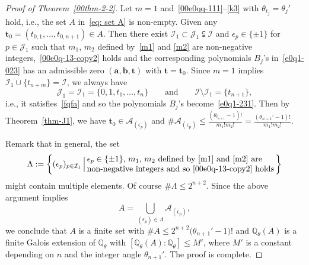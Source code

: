 \documentclass[10pt,a4paper]{amsart}
\numberwithin{equation}{section}
\def\Q{\mathbb Q}
\begin{document}
\begin{proof}[Proof of Theorem~\ref{00thm-2-2}]
Let $m=1$ and~\eqref{00e0qq-111}--\eqref{k3} with
$\theta_{t_j}=\theta_j'$ hold, i.e., the set $A$ in~\eqref{eq: set A}
is non-empty.
Given any $\boldsymbol t_0=(t_{0,1},\dots,t_{0,n+1})\in A$. Then
there exist
$\mathcal{I}_1\subset\mathcal{J}_1\subsetneqq \mathcal{I}$ and $\epsilon_p\in \{\pm 1\}$ for $p\in\mathcal{J}_1$ such that $m_1$, $m_2$ defined by~\eqref{m1} and \eqref{m2} are non-negative integers,~\eqref{00e0q-13-copy2} holds and the corresponding polynomials $B_j$'s in~\eqref{e0q1-023} has an admissible zero $(\boldsymbol a,\boldsymbol b,\boldsymbol t)$ with $\boldsymbol t=\boldsymbol t_0$.
Since $m=1$ implies $\mathcal{I}_1\cup\{t_{n+m}\}=\mathcal{I}$, we always have
\[\mathcal{J}_1=\mathcal{I}_1=\{0,1,t_1,\dots,t_n\}\qquad \text{and}\qquad\mathcal{I}\setminus \mathcal{I}_1=\{t_{n+1}\},\]
i.e., it satisfies~\eqref{fqfa} and so the polynomials $B_j$'s become~\eqref{e0q1-231}. Then by Theorem~\ref{thm-J1}, we have $\boldsymbol t_0\in\mathcal{A}_{(\epsilon_p)}$ and $\#\mathcal{A}_{(\epsilon_p)}\leq \frac{(\theta_{t_{n+1}}-1)!}{m_1!m_2!}=\frac{(\theta_{n+1}'-1)!}{m_1!m_2!}.$

Remark that in general, the set
\[
 \Lambda:=\left\{(\epsilon_p)_{p\in\mathcal{I}_1}\,\Big|\,
 \begin{array}{@{}lll@{}}\text{$\epsilon_p\in\{\pm 1\}$, $m_1$, $m_2$ defined by~\eqref{m1} and \eqref{m2} are}\\
 \text{non-negative integers and so~\eqref{00e0q-13-copy2} holds}
 \end{array}\!\!\right\}
\]
might contain multiple elements. Of course $\#\Lambda\leq
2^{n+2}$. Since the above argument implies
\[A=\bigcup\limits_{(\epsilon_p)\in \Lambda}\mathcal{A}_{(\epsilon_p)},\]
we conclude that $A$ is a finite set with $\# A\leq
2^{n+2}\bigl(\theta_{n+1}'-1\bigr)!$ and $\Q_\theta(A)$ is a finite Galois
 extension of $\Q_\theta$ with $[\Q_\theta(A):\Q_\theta]\leq M'$,
 where $M'$ is a constant depending on $n$ and the integer angle
 $\theta_{n+1}'$. The proof is complete.
\end{proof}





\end{document}
